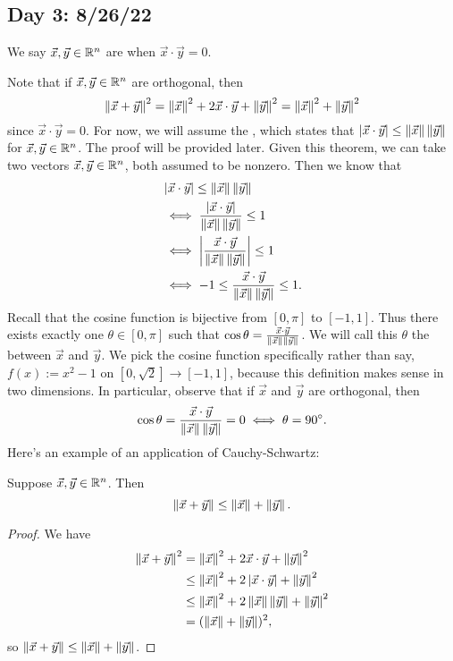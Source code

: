 \documentclass[main.tex]{subfiles}
\begin{document}
\subsection{Day 3: 8/26/22}

\begin{definition}[Orthogonality]
    We say $\vec{x}, \vec{y}\in \mathbb R^n$ are  when $\vec{x}\cdot\vec{y} = 0$.
\end{definition}
Note that if $\vec{x}, \vec{y}\in \mathbb R^n$ are orthogonal, then
\[\left\lVert \vec{x} + \vec{y} \right\rVert^2 = \left\lVert \vec{x} \right\rVert^2 + 2\vec{x}\cdot \vec{y} + \left\lVert \vec{y} \right\rVert^2 = \left\lVert \vec{x} \right\rVert^2 + \left\lVert \vec{y} \right\rVert^2\]
since $\vec{x}\cdot \vec{y} = 0$. For now, we will assume the , which states that $\left\lvert \vec{x}\cdot \vec{y} \right\rvert \le \left\lVert \vec{x} \right\rVert \left\lVert \vec{y} \right\rVert$ for $\vec{x}, \vec{y}\in \mathbb R^n$. The proof will be provided later. Given this theorem, we can take two vectors $\vec{x}, \vec{y}\in \mathbb R^n$, both assumed to be nonzero. Then we know that 
\begin{align*}
    &\left\lvert \vec{x}\cdot \vec{y} \right\rvert\le \left\lVert \vec{x} \right\rVert \left\lVert \vec{y} \right\rVert \\
    &\iff \frac{\left\lvert \vec{x}\cdot \vec{y} \right\rvert}{\left\lVert \vec{x} \right\rVert \left\lVert \vec{y} \right\rVert}\le 1 \\
    &\iff \left\lvert \frac{\vec{x}\cdot \vec{y}}{\left\lVert \vec{x} \right\rVert \left\lVert \vec{y} \right\rVert} \right\rvert\le 1 \\
    &\iff -1\le \frac{\vec{x}\cdot \vec{y}}{\left\lVert \vec{x} \right\rVert \left\lVert \vec{y} \right\rVert}\le 1.
\end{align*}
Recall that the cosine function is bijective from $[0, \pi]$ to $[-1, 1]$. Thus there exists exactly one $\theta\in [0, \pi]$ such that $\cos\theta = \frac{\vec{x}\cdot \vec{y}}{\left\lVert \vec{x} \right\rVert \left\lVert \vec{y} \right\rVert}$. We will call this $\theta$ the  between $\vec{x}$ and $\vec{y}$. We pick the cosine function specifically rather than say, $f(x):= x^2 - 1$ on $[0, \sqrt{2}]\to [-1, 1]$, because this definition makes sense in two dimensions. In particular, observe that if $\vec{x}$ and $\vec{y}$ are orthogonal, then
\[\cos\theta = \frac{\vec{x}\cdot \vec{y}}{\left\lVert \vec{x} \right\rVert \left\lVert \vec{y} \right\rVert} = 0\iff \theta = 90^\circ.\]
Here's an example of an application of Cauchy-Schwartz:

\begin{theorem}
    Suppose $\vec{x}, \vec{y}\in \mathbb R^n$. Then
    \[\left\lVert \vec{x} + \vec{y} \right\rVert\le \left\lVert \vec{x} \right\rVert + \left\lVert \vec{y} \right\rVert.\]
\end{theorem}

\begin{proof}
    We have
    \begin{align*}
        \left\lVert \vec{x} + \vec{y} \right\rVert^2 &= \left\lVert \vec{x} \right\rVert^2 + 2\vec{x}\cdot \vec{y} + \left\lVert \vec{y} \right\rVert^2 \\
        &\le \left\lVert \vec{x} \right\rVert^2 + 2\left\lvert \vec{x}\cdot \vec{y} \right\rvert + \left\lVert \vec{y} \right\rVert^2 \\
        &\le \left\lVert \vec{x} \right\rVert^2 + 2\left\lVert \vec{x} \right\rVert \left\lVert \vec{y} \right\rVert + \left\lVert \vec{y} \right\rVert^2 \\
        &=(\left\lVert \vec{x} \right\rVert + \left\lVert \vec{y} \right\rVert)^2,
    \end{align*}
    so $\left\lVert \vec{x} + \vec{y} \right\rVert \le \left\lVert \vec{x} \right\rVert + \left\lVert \vec{y} \right\rVert$.
\end{proof}
\end{document}

